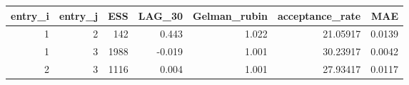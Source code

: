 \begin{longtable}{rrrrrrr}
\toprule
entry\_i & entry\_j & ESS & LAG\_30 & Gelman\_rubin & acceptance\_rate & MAE \\ 
\midrule
1 & 2 & 142 & 0.443 & 1.022 & 21.05917 & 0.0139 \\ 
1 & 3 & 1988 & -0.019 & 1.001 & 30.23917 & 0.0042 \\ 
2 & 3 & 1116 & 0.004 & 1.001 & 27.93417 & 0.0117 \\ 
\bottomrule
\end{longtable}

